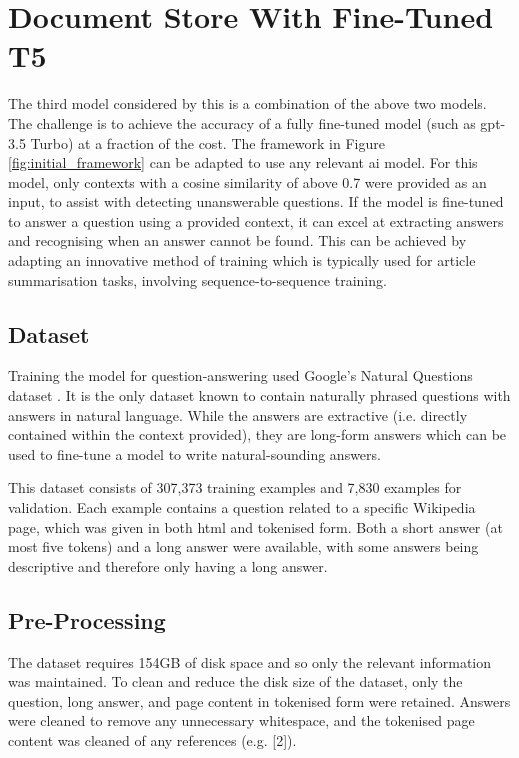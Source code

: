 \section{Document Store With Fine-Tuned T5}\label{sec:methodology_t5}
The third model considered by this \papertype is a combination of the above two models. The challenge is to achieve the accuracy of a fully fine-tuned model (such as \acrshort{gpt}-3.5 Turbo) at a fraction of the cost. The framework in Figure \ref{fig:initial_framework} can be adapted to use any relevant \acrshort{ai} model. For this model, only contexts with a cosine similarity of above 0.7 were provided as an input, to assist with detecting unanswerable questions. If the model is fine-tuned to answer a question using a provided context, it can excel at extracting answers and recognising when an answer cannot be found. This can be achieved by adapting an innovative method of training which is typically used for article summarisation tasks, involving sequence-to-sequence training. 

\subsection{Dataset}
Training the model for question-answering used Google's Natural Questions dataset \citep{NQdataset}. It is the only dataset known to contain naturally phrased questions with answers in natural language. While the answers are extractive (i.e. directly contained within the context provided), they are long-form answers which can be used to fine-tune a model to write natural-sounding answers.

This dataset consists of 307,373 training examples and 7,830 examples for validation. Each example contains a question related to a specific Wikipedia page, which was given in both \acrshort{html} and tokenised form. Both a short answer (at most five tokens) and a long answer were available, with some answers being descriptive and therefore only having a long answer.

\subsection{Pre-Processing}\label{sec:methodology_pre_processing}
The dataset requires 154GB of disk space and so only the relevant information was maintained. To clean and reduce the disk size of the dataset, only the question, long answer, and page content in tokenised form were retained. Answers were cleaned to remove any unnecessary whitespace, and the tokenised page content was cleaned of any references (e.g. [2]).

